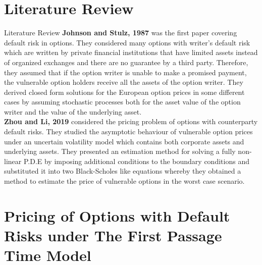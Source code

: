 \documentclass[pdf]{beamer}
\begin{document}
\section{Literature Review}
\begin{frame}[allowframebreaks]{Literature Review}
\small
\textbf{Johnson and Stulz, 1987} was the first paper covering default risk in options. They considered many options with writer's default risk which are written by private financial institutions that have limited assets instead of organized exchanges and there are no guarantee by a third party. Therefore, they assumed that if the option writer is unable to make a promised payment, the vulnerable option holders receive all the assets of the option writer. They derived closed form solutions for the European option prices in some different cases by assuming stochastic processes both for the asset value of the option writer and the value of the underlying asset.\\
\textbf{Zhou and Li, 2019} considered the pricing problem of options with counterparty default risks. They studied the asymptotic behaviour of vulnerable option prices under an uncertain volatility model which contains both corporate assets and underlying assets. They presented an estimation method for solving a fully non-linear P.D.E by imposing additional conditions to the boundary conditions and substituted it into two Black-Scholes like equations whereby they obtained a method to estimate the price of vulnerable options in the worst case scenario.
\end{frame}
\normalsize
\section{Pricing of Options with Default Risks under The First Passage Time Model}
\end{document}
